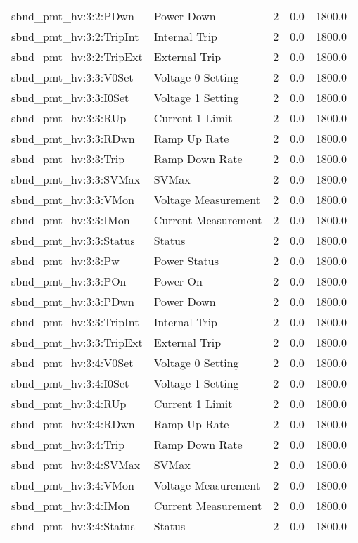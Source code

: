 \begin{center}
\begin{longtable}{l | l l l l }
sbnd\_pmt\_hv:3:2:PDwn & Power Down & 2 & 0.0 & 1800.0\\ 
sbnd\_pmt\_hv:3:2:TripInt & Internal Trip & 2 & 0.0 & 1800.0\\ 
sbnd\_pmt\_hv:3:2:TripExt & External Trip & 2 & 0.0 & 1800.0\\ 
sbnd\_pmt\_hv:3:3:V0Set & Voltage 0 Setting & 2 & 0.0 & 1800.0\\ 
sbnd\_pmt\_hv:3:3:I0Set & Voltage 1 Setting & 2 & 0.0 & 1800.0\\ 
sbnd\_pmt\_hv:3:3:RUp & Current 1 Limit & 2 & 0.0 & 1800.0\\ 
sbnd\_pmt\_hv:3:3:RDwn & Ramp Up Rate & 2 & 0.0 & 1800.0\\ 
sbnd\_pmt\_hv:3:3:Trip & Ramp Down Rate & 2 & 0.0 & 1800.0\\ 
sbnd\_pmt\_hv:3:3:SVMax & SVMax & 2 & 0.0 & 1800.0\\ 
sbnd\_pmt\_hv:3:3:VMon & Voltage Measurement & 2 & 0.0 & 1800.0\\ 
sbnd\_pmt\_hv:3:3:IMon & Current Measurement & 2 & 0.0 & 1800.0\\ 
sbnd\_pmt\_hv:3:3:Status & Status & 2 & 0.0 & 1800.0\\ 
sbnd\_pmt\_hv:3:3:Pw & Power Status & 2 & 0.0 & 1800.0\\ 
sbnd\_pmt\_hv:3:3:POn & Power On & 2 & 0.0 & 1800.0\\ 
sbnd\_pmt\_hv:3:3:PDwn & Power Down & 2 & 0.0 & 1800.0\\ 
sbnd\_pmt\_hv:3:3:TripInt & Internal Trip & 2 & 0.0 & 1800.0\\ 
sbnd\_pmt\_hv:3:3:TripExt & External Trip & 2 & 0.0 & 1800.0\\ 
sbnd\_pmt\_hv:3:4:V0Set & Voltage 0 Setting & 2 & 0.0 & 1800.0\\ 
sbnd\_pmt\_hv:3:4:I0Set & Voltage 1 Setting & 2 & 0.0 & 1800.0\\ 
sbnd\_pmt\_hv:3:4:RUp & Current 1 Limit & 2 & 0.0 & 1800.0\\ 
sbnd\_pmt\_hv:3:4:RDwn & Ramp Up Rate & 2 & 0.0 & 1800.0\\ 
sbnd\_pmt\_hv:3:4:Trip & Ramp Down Rate & 2 & 0.0 & 1800.0\\ 
sbnd\_pmt\_hv:3:4:SVMax & SVMax & 2 & 0.0 & 1800.0\\ 
sbnd\_pmt\_hv:3:4:VMon & Voltage Measurement & 2 & 0.0 & 1800.0\\ 
sbnd\_pmt\_hv:3:4:IMon & Current Measurement & 2 & 0.0 & 1800.0\\ 
sbnd\_pmt\_hv:3:4:Status & Status & 2 & 0.0 & 1800.0\\ 

\end{longtable}
\end{center}
